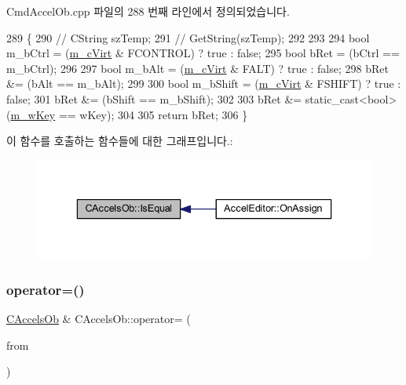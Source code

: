 Cmd\+Accel\+Ob.\+cpp 파일의 288 번째 라인에서 정의되었습니다.


\begin{DoxyCode}
289 \{
290   \textcolor{comment}{//        CString szTemp;}
291   \textcolor{comment}{//        GetString(szTemp);}
292 
293   
294   \textcolor{keywordtype}{bool} m\_bCtrl = (\mbox{\hyperlink{class_c_accels_ob_a08b7003ccf92c6afcf31878960d8eee1}{m\_cVirt}} & FCONTROL) ? \textcolor{keyword}{true} : \textcolor{keyword}{false};
295   \textcolor{keywordtype}{bool} bRet = (bCtrl == m\_bCtrl);
296   
297   \textcolor{keywordtype}{bool} m\_bAlt = (\mbox{\hyperlink{class_c_accels_ob_a08b7003ccf92c6afcf31878960d8eee1}{m\_cVirt}} & FALT) ? \textcolor{keyword}{true} : \textcolor{keyword}{false};
298   bRet &= (bAlt == m\_bAlt);
299   
300   \textcolor{keywordtype}{bool} m\_bShift = (\mbox{\hyperlink{class_c_accels_ob_a08b7003ccf92c6afcf31878960d8eee1}{m\_cVirt}} & FSHIFT) ? \textcolor{keyword}{true} : \textcolor{keyword}{false};
301   bRet &= (bShift == m\_bShift);
302   
303   bRet &= \textcolor{keyword}{static\_cast<}\textcolor{keywordtype}{bool}\textcolor{keyword}{>}(\mbox{\hyperlink{class_c_accels_ob_a1891250e9a4d00c0862f3a90a965d635}{m\_wKey}} == wKey);
304   
305   \textcolor{keywordflow}{return} bRet;
306 \}
\end{DoxyCode}
이 함수를 호출하는 함수들에 대한 그래프입니다.\+:
\nopagebreak
\begin{figure}[H]
\begin{center}
\leavevmode
\includegraphics[width=336pt]{class_c_accels_ob_a32714a4454d398d3d3a68d1705a76bc5_icgraph}
\end{center}
\end{figure}
\mbox{\label{class_c_accels_ob_ae6075be9ad7656823f5cecd277dd7d6e}} 
\subsubsection{\texorpdfstring{operator=()}{operator=()}}
{\footnotesize\ttfamily \mbox{\hyperlink{class_c_accels_ob}{C\+Accels\+Ob}} \& C\+Accels\+Ob\+::operator= (\begin{DoxyParamCaption}\item[{\mbox{\hyperlink{getopt1_8c_a2c212835823e3c54a8ab6d95c652660e}{const}} \mbox{\hyperlink{class_c_accels_ob}{C\+Accels\+Ob}} \&}]{from }\end{DoxyParamCaption})}



